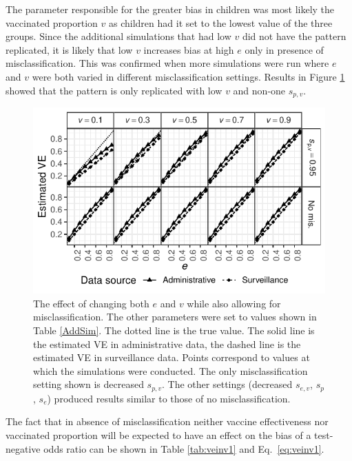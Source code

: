 \documentclass[11pt]{article}
\begin{document}
The parameter responsible for the greater bias in children was most likely the vaccinated proportion $v$ as children had it set to the lowest value of the three groups. Since the additional simulations that had low $v$ did not have the pattern replicated, it is likely that low $v$ increases bias at high $e$ only in presence of misclassification. This was confirmed when more simulations were run where $e$ and $v$ were both varied in different misclassification settings. Results in Figure \ref{veinv-summ} showed that the pattern is only replicated with low $v$ and non-one $s_{p,v}$.

\pagebreak

\begin{figure}[H]
	\centering
		\includegraphics[width=0.85\linewidth]{../fig-veinv/veinv-limited.pdf}
		\caption{
The effect of changing both $e$ and $v$ while also allowing for misclassification. The other parameters were set to values shown in Table \ref{AddSim}. The dotted line is the true value. The solid line is the estimated VE in administrative data, the dashed line is the estimated VE in surveillance data. Points correspond to values at which the simulations were conducted.  The only misclassification setting shown is decreased $s_{p,v}$. The other settings (decreased $s_{e,v}$,  $s_p$, $s_e$) produced results similar to those of no misclassification. \label{veinv-summ}
		}	
\end{figure}

The fact that in absence of misclassification neither vaccine effectiveness nor vaccinated proportion will be expected to have an effect on the bias of a test-negative odds ratio can be shown in Table \ref{tab:veinv1} and Eq.\ \ref{eq:veinv1}.

\begin{table}[h]
\centering
\caption{
Expected proportions of surveillance data.
Assumptions: no misclassification, $t_a$= 1, $t_n$= 1.
$F$ - flu-infected, $V$ - vaccinated.
 \label{tab:veinv1}
}
	
\end{table}
\end{document}
